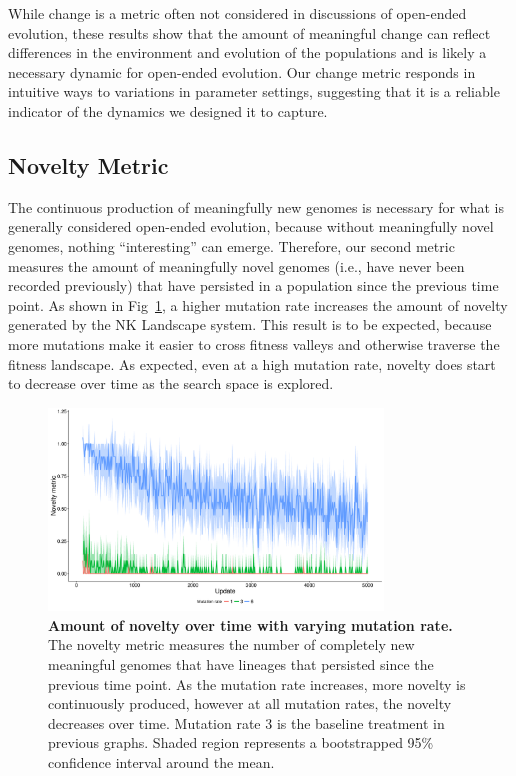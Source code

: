 \documentclass[letterpaper]{article}
\begin{document}
While change is a metric often not considered in discussions of open-ended evolution, these results show that the amount of meaningful change can reflect differences in the environment and evolution of the populations and is likely a necessary dynamic for open-ended evolution. Our change metric responds in intuitive ways to variations in parameter settings, suggesting that it is a reliable indicator of the dynamics we designed it to capture. 

\subsection{Novelty Metric}
The continuous production of meaningfully new genomes is necessary for what is generally considered open-ended evolution, because without meaningfully novel genomes, nothing ``interesting'' can emerge. Therefore, our second metric measures the amount of meaningfully novel genomes (i.e., have never been recorded previously) that have persisted in a population since the previous time point. As shown in Fig~\ref{novelty_time}, a higher mutation rate increases the amount of novelty generated by the NK Landscape system. This result is to be expected, because more mutations make it easier to cross fitness valleys and otherwise traverse the fitness landscape. As expected, even at a high mutation rate, novelty does start to decrease over time as the search space is explored.

\begin{figure}
\includegraphics[width=3.5in]{figs/novelty_mean_mut_rate.png}
\caption{\textbf{Amount of novelty over time with varying mutation rate.} The novelty metric measures the number of completely new meaningful genomes that have lineages that persisted since the previous time point. As the mutation rate increases, more novelty is continuously produced, however at all mutation rates, the novelty decreases over time. Mutation rate 3 is the baseline treatment in previous graphs. Shaded region represents a bootstrapped 95\% confidence interval around the mean.}
\label{novelty_time}
\end{figure}
\end{document}
